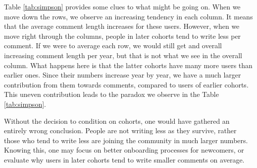 
Table \ref{tab:simpson} provides some clues to what might be going on. When we move down the rows, we observe an increasing tendency in each column. It means that the average comment length increases for these users. However, when we move right through the columns, people in later cohorts tend to write less per comment. If we were to average each row, we would still get and overall increasing comment length per year, but that is not what we see in the overall column. What happens here is that the latter cohorts have many more users than earlier ones. Since their numbers increase year by year, we have a  much larger contribution from them towards comments, compared to users of earlier cohorts. This uneven contribution leads to the paradox we observe in the Table \ref{tab:simpson}. 


Without the decision to condition on cohorts, one would have gathered an entirely wrong conclusion. People are not writing less as they survive, rather those who tend to write less are joining the community in much larger numbers. Knowing this, one may focus on better onboarding processes for newcomers, or evaluate why users in later cohorts tend to write smaller comments on average. 

